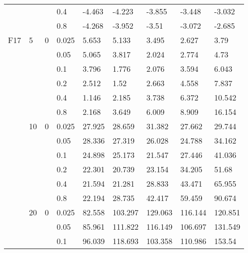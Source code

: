 \begin{longtable}{|l|l|l|l|l|l|l|l|l|}
\cmidrule{4-9} &     &          & 0.4            & -4.463     & -4.223     & -3.855     & -3.448     & -3.032     \\
\cmidrule{4-9} &     &          & 0.8            & -4.268     & -3.952     & -3.51      & -3.072     & -2.685     \\ \midrule
F17            & 5   & 0        & 0.025          & 5.653      & 5.133      & 3.495      & 2.627      & 3.79       \\
\cmidrule{4-9} &     &          & 0.05           & 5.065      & 3.817      & 2.024      & 2.774      & 4.73       \\
\cmidrule{4-9} &     &          & 0.1            & 3.796      & 1.776      & 2.076      & 3.594      & 6.043      \\
\cmidrule{4-9} &     &          & 0.2            & 2.512      & 1.52       & 2.663      & 4.558      & 7.837      \\
\cmidrule{4-9} &     &          & 0.4            & 1.146      & 2.185      & 3.738      & 6.372      & 10.542     \\
\cmidrule{4-9} &     &          & 0.8            & 2.168      & 3.649      & 6.009      & 8.909      & 16.154     \\
\cmidrule{2-9} & 10  & 0        & 0.025          & 27.925     & 28.659     & 31.382     & 27.662     & 29.744     \\
\cmidrule{4-9} &     &          & 0.05           & 28.336     & 27.319     & 26.028     & 24.788     & 34.162     \\
\cmidrule{4-9} &     &          & 0.1            & 24.898     & 25.173     & 21.547     & 27.446     & 41.036     \\
\cmidrule{4-9} &     &          & 0.2            & 22.301     & 20.739     & 23.154     & 34.205     & 51.68      \\
\cmidrule{4-9} &     &          & 0.4            & 21.594     & 21.281     & 28.833     & 43.471     & 65.955     \\
\cmidrule{4-9} &     &          & 0.8            & 22.194     & 28.735     & 42.417     & 59.459     & 90.674     \\
\cmidrule{2-9} & 20  & 0        & 0.025          & 82.558     & 103.297    & 129.063    & 116.144    & 120.851    \\
\cmidrule{4-9} &     &          & 0.05           & 85.961     & 111.822    & 116.149    & 106.697    & 131.549    \\
\cmidrule{4-9} &     &          & 0.1            & 96.039     & 118.693    & 103.358    & 110.986    & 153.54     \\

\end{longtable}
